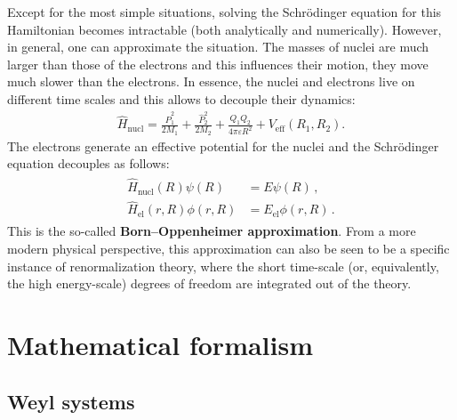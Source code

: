     Except for the most simple situations, solving the Schr\"odinger equation for this Hamiltonian becomes intractable (both analytically and numerically). However, in general, one can approximate the situation. The masses of nuclei are much larger than those of the electrons and this influences their motion, they move much slower than the electrons. In essence, the nuclei and electrons live on different time scales and this allows to decouple their dynamics:
    \begin{gather}
        \widehat{H}_{\text{nucl}} = \frac{\widehat{P}_1^2}{2M_1} + \frac{\widehat{P}_2^2}{2M_2} + \frac{Q_1Q_2}{4\pi\varepsilon R^2} + V_{\text{eff}}(R_1,R_2).
    \end{gather}
    The electrons generate an effective potential for the nuclei and the Schr\"odinger equation decouples as follows:
    \begin{gather}
        \begin{aligned}
            \widehat{H}_{\text{nucl}}(R)\psi(R) &= E\psi(R)\,,\\
            \widehat{H}_{\text{el}}(r,R)\phi(r,R) &= E_{\text{el}}\phi(r,R)\,.
        \end{aligned}
    \end{gather}
    This is the so-called \textbf{Born--Oppenheimer approximation}. From a more modern physical perspective, this approximation can also be seen to be a specific instance of renormalization theory, where the short time-scale (or, equivalently, the high energy-scale) degrees of freedom are integrated out of the theory.

\section{Mathematical formalism}\label{section:mathematical_formalism_qm}
\subsection{Weyl systems}

